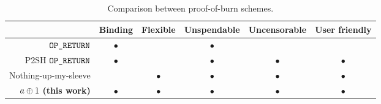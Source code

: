 \begin{table}[h!]
    \newcommand{\y}{$\bullet$}
    \newcommand{\n}{}
    \centering
    \caption{Comparison between proof-of-burn schemes.\label{table:comparison}}

    \begin{tabular}{ |r|c|c|c|c|c| }
     \hline
                                        & Binding & Flexible & Unspendable & Uncensorable & User friendly \\
     \hline
     $\texttt{OP\_RETURN}$                        & \y      & \n       & \y          & \n & \n \\
     P2SH $\texttt{OP\_RETURN}$                   & \y      & \n       & \y          & \y & \y \\
     Nothing-up-my-sleeve               & \n      & \y       & \y          & \y & \y \\
     $a \oplus 1$ \textbf{(this work)}    & \y      & \y       & \y          & \y & \y \\
     \hline
    \end{tabular}
\end{table}
